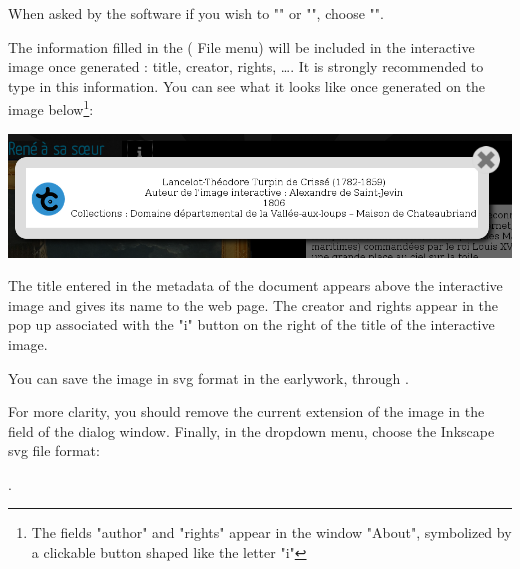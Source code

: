 
When asked by the software if you wish to "" or "", choose "".

The information filled in the  (\softmenu
{File} menu) will be included in the interactive image once
generated : title, creator, rights, \ldots. It is strongly recommended to type in this information.
You can see what it looks like once generated on the image below\footnote{The
fields "author" and "rights" appear in the window
"About", symbolized by a clickable button shaped like the letter "i"}:\\

\begin{center}
 \includegraphics[width=\textwidth]{images/ia_title}\\
\end{center}

 The title entered in the metadata of the document appears above 
the interactive image and gives its name to the web page. The creator and 
 rights appear in the pop up associated with the "i" button 
on the right of the title of the interactive image.

You can save the image in svg format in the earlywork, 
through  .

For more clarity, you should remove the current extension of the image 
in the field  of the dialog window. Finally, in the 
dropdown menu, choose the Inkscape svg file format:

.

